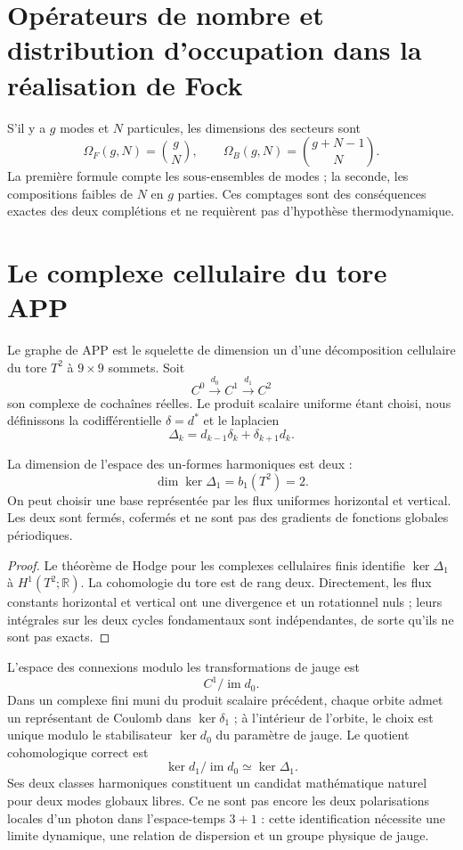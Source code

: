 \section{Opérateurs de nombre et distribution d'occupation dans la réalisation de Fock}

S’il y a \(g\) modes et \(N\) particules, les dimensions des secteurs sont
\[
 \Omega_F(g,N)=\binom gN,
 \qquad
 \Omega_B(g,N)=\binom{g+N-1}{N}.
\]
La première formule compte les sous-ensembles de modes ; la seconde, les compositions
faibles de \(N\) en \(g\) parties. Ces comptages sont des conséquences exactes des
deux complétions et ne requièrent pas d'hypothèse thermodynamique.

\section{Le complexe cellulaire du tore APP}

Le graphe de APP est le squelette de dimension un d’une décomposition cellulaire du tore
\(T^2\) à \(9\times9\) sommets. Soit
\[
 C^0\xrightarrow{d_0}C^1\xrightarrow{d_1}C^2
\]
son complexe de cochaînes réelles. Le produit scalaire uniforme étant choisi,
nous définissons la codifférentielle \(\delta=d^*\) et le laplacien
\[
 \Delta_k=d_{k-1}\delta_k+\delta_{k+1}d_k.
\]

\begin{theorem}
La dimension de l'espace des un-formes harmoniques est deux :
\[
 \dim\ker\Delta_1=b_1(T^2)=2.
\]
On peut choisir une base représentée par les flux uniformes horizontal et
vertical. Les deux sont fermés, cofermés et ne sont pas des gradients de fonctions
globales périodiques.
\end{theorem}

\begin{proof}
Le théorème de Hodge pour les complexes cellulaires finis identifie
\(\ker\Delta_1\) à \(H^1(T^2;\mathbb R)\). La cohomologie du tore est de
rang deux. Directement, les flux constants horizontal et vertical ont
une divergence et un rotationnel nuls ; leurs intégrales sur les deux cycles
fondamentaux sont indépendantes, de sorte qu’ils ne sont pas exacts.
\end{proof}

L’espace des connexions modulo les transformations de jauge est
\[
 C^1/\operatorname{im}d_0.
\]
Dans un complexe fini muni du produit scalaire précédent, chaque orbite
admet un représentant de Coulomb dans \(\ker\delta_1\) ; à l’intérieur de l’orbite,
le choix est unique modulo le stabilisateur \(\ker d_0\) du paramètre de
jauge. Le quotient cohomologique correct est
\[
 \ker d_1/\operatorname{im}d_0
 \simeq \ker\Delta_1 .
\]
Ses deux classes harmoniques constituent un candidat mathématique naturel pour
deux modes globaux libres. Ce ne sont pas encore les deux polarisations locales d’un
photon dans l’espace-temps \(3+1\) : cette identification nécessite une
limite dynamique, une relation de dispersion et un groupe physique de jauge.

